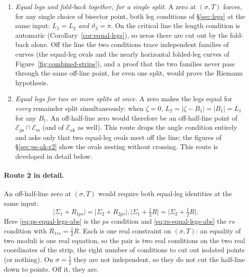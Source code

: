 \documentclass[11pt]{article}
\theoremstyle{definition}
\begin{document}
\begin{enumerate}
\item \emph{Equal legs and fold-back together, for a single split.}
A zero at $(\sigma,T)$ forces, for any single choice of bisector point, both
leg conditions of \S\ref{sec:legs} at the same input: $L_1=L_2$ \emph{and}
$\vartheta_2=\pi$. On the critical line the length condition is automatic
(Corollary~\ref{cor:equal-legs}), so zeros there are cut out by the fold-back
alone. Off the line the two conditions trace independent families of curves
(the equal-leg ovals and the nearly horizontal folded-leg curves of
Figure~\ref{fig:combined-strips}), and a proof that the two families never
pass through the same off-line point, for even one split, would prove the
Riemann hypothesis.

\item \emph{Equal legs for two or more splits at once.}
A zero makes the legs equal for \emph{every} remainder split simultaneously: when
$\zeta=0$, $L_2=|\zeta-B_1|=|B_1|=L_1$ for any $B_1$. An off-half-line zero
would therefore be an off-half-line point of
$\mathcal{E}_{\mathrm{ps}}\cap\mathcal{E}_{\mathrm{rs}}$ (and of
$\mathcal{E}_{\mathrm{ak}}$ as well). This route drops the angle condition
entirely and asks only that two equal-leg ovals meet off the line; the
figures of \S\ref{sec:ps-ak-r2} show the ovals nesting without crossing.
This route is developed in detail below.
\end{enumerate}

\paragraph{Route 2 in detail.}
An off-half-line zero at $(\sigma,T)$ would require both equal-leg
identities at the same input:
\begin{subequations}\label{eq:equal-legs-abs}
\begin{equation}\label{eq:ps-equal-legs-abs}
\bigl|\Sigma_1+R_{1ps}\bigr|
=
\bigl|\Sigma_2+R_{2ps}\bigr|,
\end{equation}
\begin{equation}\label{eq:rs-equal-legs-abs}
\bigl|\Sigma_1+\tfrac12 R\bigr|
=
\bigl|\Sigma_2+\tfrac12 R\bigr|.
\end{equation}
\end{subequations}
Here \eqref{eq:ps-equal-legs-abs} is the $ps$ condition and
\eqref{eq:rs-equal-legs-abs} the $rs$ condition with $R_{1rs}=\tfrac12 R$.
Each is one real constraint on $(\sigma,T)$: an equality of two moduli is
one real equation, so the pair is two real conditions on the two real
coordinates of the strip, the right number of conditions to cut out isolated points (or
nothing).
On $\sigma=\tfrac12$ they are not independent, so they do not cut the
half-line down to points. Off it, they are.
\end{document}
